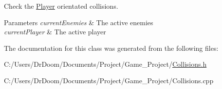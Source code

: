 Check the \hyperlink{class_player}{Player} orientated collisions. 


\begin{DoxyParams}{Parameters}
{\em current\+Enemies} & The active enemies \\
\hline
{\em current\+Player} & The active player \\
\hline
\end{DoxyParams}


The documentation for this class was generated from the following files\+:\begin{DoxyCompactItemize}
\item 
C\+:/\+Users/\+Dr\+Doom/\+Documents/\+Project/\+Game\+\_\+\+Project/\hyperlink{_collisions_8h}{Collisions.\+h}\item 
C\+:/\+Users/\+Dr\+Doom/\+Documents/\+Project/\+Game\+\_\+\+Project/Collisions.\+cpp\end{DoxyCompactItemize}
